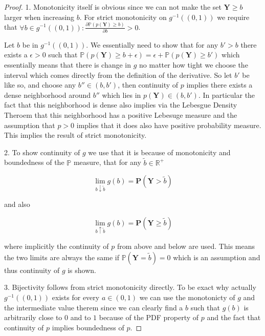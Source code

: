 \begin{proof}
    1. Monotonicity itself is obvious since we can not make the set $\mathbf{Y} \geq b$ larger when increasing $b$. For strict monotonicity on $g^{-1}((0,1))$ we require that $\forall b \in g^{-1}((0,1)): \frac{\partial \mathbb{P}(p(\mathbf{Y}) \geq b)}{\partial b} > 0$.

    Let $b$ be in $g^{-1}((0,1))$. We essentially need to show that for any $b' > b$ there exists a $\epsilon > 0$ such that $\mathbb{P}(p(\mathbf{Y}) \geq b + \epsilon) = \epsilon + \mathbb{P}(p(\mathbf{Y}) \geq b')$ which essentially means that there is change in $g$ no matter how tight we choose the interval which comes directly from the definition of the derivative. So let $b'$ be like so, and choose any $b'' \in (b, b')$, then continuity of $p$ implies there exists a dense neighborhood around $b''$ which lies in $p(\mathbf{Y}) \in (b, b')$. In particular the fact that this neighborhood is dense also implies via the Lebesgue Density Theroem that this neighborhood has a positive Lebesuge measure and the assumption that $p > 0$ implies that it does also have positive probability measure. This implies the result of strict monotonicity.

    2. To show continuity of $g$ we use that it is because of monotonicity and boundedness of the $\mathbb{P}$ measure, that for any $\tilde{b}\in\mathbb{R}^+$

    \begin{equation}
        \lim_{b \downarrow \tilde{b}} g(b) = \mathbf{P}(\mathbf{Y} > \tilde{b})
    \end{equation}

    and also

    \begin{equation}
        \lim_{b \uparrow \tilde{b}} g(b) = \mathbf{P}(\mathbf{Y} \geq \tilde{b})
    \end{equation}

    where implicitly the continuity of $p$ from above and below are used. This means the two limits are always the same if $\mathbb{P}(\mathbf{Y} = \tilde{b}) = 0$ which is an assumption and thus continuity of $g$ is shown.

    3. Bijectivity follows from strict monotonicity directly. To be exact why actually $g^{-1}((0,1))$ exists for every $a \in (0,1)$ we can use the monotonicty of $g$ and the intermediate value therem since we can clearly find a $b$ such that $g(b)$ is arbitrarily close to $0$ and to $1$ because of the PDF property of $p$ and the fact that continuity of $p$ implies boundedness of $p$.


\end{proof}
